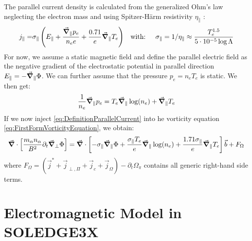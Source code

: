  The parallel current density is calculated from the generalized Ohm's law neglecting the electron mass and using Spitzer-Härm resistivity $\eta_\parallel$ \cite{SpitzerResistivity}:
 \begin{align} 
 	\label{eq:DefinitionParallelCurrent}
 	j_\parallel =& \sigma_\parallel \left(E_\parallel + \frac{\vec{\grad}_\parallel p_e}{n_ee} + \frac{0.71}{e}\vec{\grad}_\parallel T_e\right) & \text{with: }&& \sigma_\parallel = 1/\eta_\parallel \approx  \frac{T_e^{1.5}}{5\cdot 10^{-5}\log\Lambda}
 \end{align}
 For now, we assume a static magnetic field and define the parallel electric field as the negative gradient of the electrostatic potential in parallel direction $E_\parallel=-\vec{\grad}_\parallel\Phi$. We can further assume that the pressure $p_e=n_eT_e$ is static. We then get:  
 $$\frac{1}{n_e}\vec{\grad}_\parallel p_e = T_e\vec{\grad}_\parallel\log(n_e) + \vec{\grad}_\parallel T_e$$
 If we now inject \autoref{eq:DefinitionParallelCurrent} into he vorticity equation \autoref{eq:FirstFormVorticityEquation}, we obtain: 
\begin{equation}
	\label{eq:ElectrostaticVorticityEquation}
	 \vec{\grad}\cdot\left[\frac{m_\alpha n_\alpha}{ B^2}\partial_t\vec{\grad}_\perp\Phi\right]  = \vec{\grad}\cdot\left[-\sigma_\parallel \vec{\grad}_\parallel\Phi + \frac{\sigma_\parallel T_e}{e}\vec{\grad}_\parallel\log(n_e) + \frac{1.71\sigma_\parallel}{e}\vec{\grad}_\parallel T_e\right]\vec{b} + F_\Omega
\end{equation}
where $F_\Omega = \left(\vec{j}^* + \vec{j}_{\perp,\Pi} + \vec{j}_{c} + \vec{j}_\Omega\right) - \partial_t \Omega_\pi$ contains all generic right-hand side terms. \\



\section{Electromagnetic Model in SOLEDGE3X}

